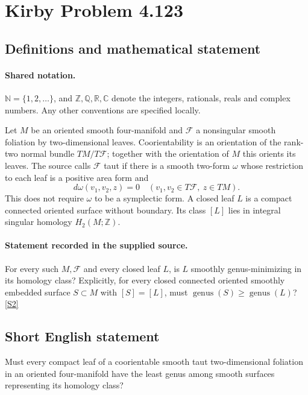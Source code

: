\documentclass[11pt]{article}
\newcommand{\sref}[2]{\hyperlink{source:#1:#2}{[S#2]}}
\begin{document}
\section{Kirby Problem 4.123}\label{statement}

\subsection{Definitions and mathematical statement}

\paragraph{Shared notation.}$\mathbb N=\{1,2,\ldots\}$, and $\mathbb Z,\mathbb Q,\mathbb R,\mathbb C$ denote the integers, rationals, reals and complex numbers. Any other conventions are specified locally.


Let $M$ be an oriented smooth four-manifold and $\mathcal F$ a nonsingular smooth foliation by two-dimensional leaves. Coorientability is an orientation of the rank-two normal bundle $TM/T\mathcal F$; together with the orientation of $M$ this orients its leaves. The source calls $\mathcal F$ taut if there is a smooth two-form $\omega$ whose restriction to each leaf is a positive area form and
\[
 d\omega(v_1,v_2,z)=0
 \quad(v_1,v_2\in T\mathcal F,\ z\in TM).
\]
This does not require $\omega$ to be a symplectic form. A closed leaf $L$ is a compact connected oriented surface without boundary. Its class $[L]$ lies in integral singular homology $H_2(M;\mathbb Z)$.
\paragraph{Statement recorded in the supplied source.}
For every such $M,\mathcal F$ and every closed leaf $L$, is $L$ smoothly genus-minimizing in its homology class? Explicitly, for every closed connected oriented smoothly embedded surface $S\subset M$ with $[S]=[L]$, must $\operatorname{genus}(S)\geq\operatorname{genus}(L)$? \sref{statement}{2}
\subsection{Short English statement}
Must every compact leaf of a coorientable smooth taut two-dimensional foliation in an oriented four-manifold have the least genus among smooth surfaces representing its homology class?
\end{document}
